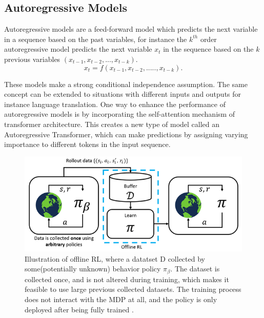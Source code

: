\documentclass[conference]{IEEEtran}
\begin{document}
\subsection{Autoregressive Models}\label{AA}

Autoregressive models are a feed-forward model which predicts the next variable in a sequence based  on the past variables, for instance the \( k^{th}\) order autoregressive model predicts the next variable \(x_t\) in the sequence based on the \( k\) previous variables \( (x_{t-1}, x_{t-2},..., x_{t-k})\).
\begin{equation}
x_t = f(x_{t-1}, x_{t-2},....., x_{t-k}).
\end{equation}


These models make a strong conditional independence assumption. The same concept can be extended to situations with different inputs and outputs for instance language translation. One way to enhance the performance of autoregressive models is by incorporating the self-attention mechanism of transformer architecture. This creates a new type of model called an Autoregressive Transformer, which can make predictions by assigning varying importance to different tokens in the input sequence. 



\begin{figure}[htbp]
\centerline{\includegraphics[scale=0.39]{Images/offlineRL.png}}
\caption{Illustration of offline RL, where a datatset D collected by some(potentially unknown) behavior policy \(\pi_{\beta}\). The dataset is collected once, and is not altered during training, which makes it feasible to use large previous collected datasets. The training process does not interact with the MDP at all, and the policy is only deployed after being fully trained \cite{b7}.}
\label{fig}
\end{figure}
\end{document}
